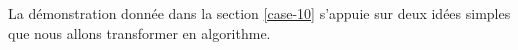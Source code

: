 \leavevmode
\smallskip

La démonstration donnée dans la section \ref{case-10} s'appuie sur deux idées simples que nous allons transformer en algorithme.


